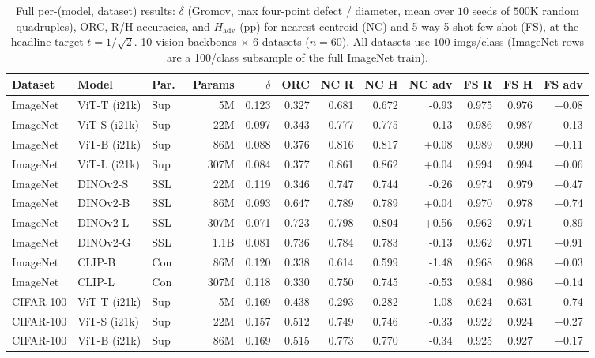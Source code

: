 \begin{table}[!htbp]
\caption{Full per-(model, dataset) results: $\delta$ (Gromov, max four-point defect / diameter, mean over $10$ seeds of $500\mathrm{K}$ random quadruples), ORC, R/H accuracies, and $H_{\mathrm{adv}}$ (pp) for nearest-centroid (NC) and 5-way 5-shot few-shot (FS), at the headline target $t = 1/\sqrt{2}$. 10 vision backbones $\times$ 6 datasets ($n = 60$). All datasets use $100$ imgs/class (ImageNet rows are a 100/class subsample of the full ImageNet train).}
\label{tab:full-results}
\centering\scriptsize
\begin{tabular}{lllrrr|rrr|rrr}
\toprule
Dataset & Model & Par.\ & Params & $\delta$ & ORC & NC R & NC H & NC adv & FS R & FS H & FS adv \\
\midrule
ImageNet & ViT-T (i21k) & Sup & 5M & 0.123 & 0.327 & 0.681 & 0.672 & -0.93 & 0.975 & 0.976 & +0.08 \\
ImageNet & ViT-S (i21k) & Sup & 22M & 0.097 & 0.343 & 0.777 & 0.775 & -0.13 & 0.986 & 0.987 & +0.13 \\
ImageNet & ViT-B (i21k) & Sup & 86M & 0.088 & 0.376 & 0.816 & 0.817 & +0.08 & 0.989 & 0.990 & +0.11 \\
ImageNet & ViT-L (i21k) & Sup & 307M & 0.084 & 0.377 & 0.861 & 0.862 & +0.04 & 0.994 & 0.994 & +0.06 \\
ImageNet & DINOv2-S & SSL & 22M & 0.119 & 0.346 & 0.747 & 0.744 & -0.26 & 0.974 & 0.979 & +0.47 \\
ImageNet & DINOv2-B & SSL & 86M & 0.093 & 0.647 & 0.789 & 0.789 & +0.04 & 0.970 & 0.978 & +0.74 \\
ImageNet & DINOv2-L & SSL & 307M & 0.071 & 0.723 & 0.798 & 0.804 & +0.56 & 0.962 & 0.971 & +0.89 \\
ImageNet & DINOv2-G & SSL & 1.1B & 0.081 & 0.736 & 0.784 & 0.783 & -0.13 & 0.962 & 0.971 & +0.91 \\
ImageNet & CLIP-B & Con & 86M & 0.120 & 0.338 & 0.614 & 0.599 & -1.48 & 0.968 & 0.968 & +0.03 \\
ImageNet & CLIP-L & Con & 307M & 0.118 & 0.330 & 0.750 & 0.745 & -0.53 & 0.984 & 0.986 & +0.14 \\
\midrule
CIFAR-100 & ViT-T (i21k) & Sup & 5M & 0.169 & 0.438 & 0.293 & 0.282 & -1.08 & 0.624 & 0.631 & +0.74 \\
CIFAR-100 & ViT-S (i21k) & Sup & 22M & 0.157 & 0.512 & 0.749 & 0.746 & -0.33 & 0.922 & 0.924 & +0.27 \\
CIFAR-100 & ViT-B (i21k) & Sup & 86M & 0.169 & 0.515 & 0.773 & 0.770 & -0.34 & 0.925 & 0.927 & +0.17 \\

\end{tabular}
\end{table}
